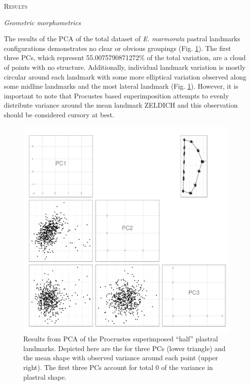 \documentclass[12pt,letterpaper]{article}\usepackage{graphicx, color}
\renewcommand{\section}[1]{%
\bigskip
\begin{center}
\begin{Large}
\normalfont\scshape #1
\medskip
\end{Large}
\end{center}}
\renewcommand{\subsection}[1]{%
\bigskip
\begin{center}
\begin{large}
\normalfont\itshape #1
\end{large}
\end{center}}
\begin{document}
\section{Results}
\subsection{Geometric morphometrics}
The results of the PCA of the total dataset of \textit{E. marmorata} pastral landmarks configurations demonstrates no clear or obvious groupings (Fig. \ref{fig:pca}). The first three PCs, which represent 55.0075790871272\% of the total variation, are a cloud of points with no structure. Additionally, individual landmark variation is mostly circular around each landmark with some more elliptical variation observed along some midline landmarks and the most lateral landmark (Fig. \ref{fig:pca}). However, it is important to note that Procustes based superimposition attempts to evenly distribute variance around the mean landmark ZELDICH and this observation should be considered cursory at best.

\begin{figure}[ht]
  \centering
  \includegraphics[width = \textwidth]{figure/pca_res}
  \caption{Results from PCA of the Procrustes superimposed ``half'' plastral landmarks. Depicted here are the for three PCs (lower triangle) and the mean shape with observed variance around each point (upper right). The first three PCs account for total 0 of the variance in plastral shape.}
  \label{fig:pca}
\end{figure}
\end{document}
